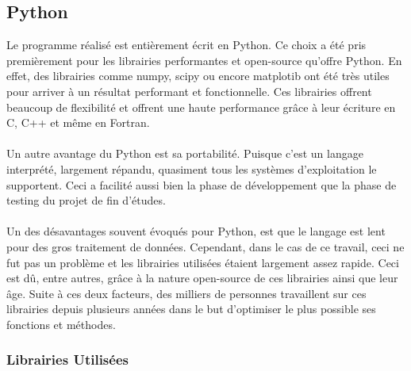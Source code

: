 \documentclass[11pt]{article}
\begin{document}
\subsection{Python}

Le programme réalisé est entièrement écrit en Python.
Ce choix a été pris premièrement pour les librairies performantes et open-source qu'offre Python.
En effet, des librairies comme numpy, scipy ou encore matplotib ont été très utiles pour arriver à un résultat performant et fonctionnelle.
Ces librairies offrent beaucoup de flexibilité et offrent une haute performance grâce à leur écriture en C, C++ et même en Fortran.\\
\\
Un autre avantage du Python est sa portabilité.
Puisque c'est un langage interprété, largement répandu, quasiment tous les systèmes d'exploitation le supportent.
Ceci a facilité aussi bien la phase de développement que la phase de testing du projet de fin d'études.\\
\\
Un des désavantages souvent évoqués pour Python, est que le langage est lent pour des gros traitement de données.
Cependant, dans le cas de ce travail, ceci ne fut pas un problème et les librairies utilisées étaient largement assez rapide.
Ceci est dû, entre autres, grâce à la nature open-source de ces librairies ainsi que leur âge.
Suite à ces deux facteurs, des milliers de personnes travaillent sur ces librairies depuis plusieurs années dans le but d'optimiser le plus possible ses fonctions et méthodes.

\subsubsection{Librairies Utilisées}
\end{document}
